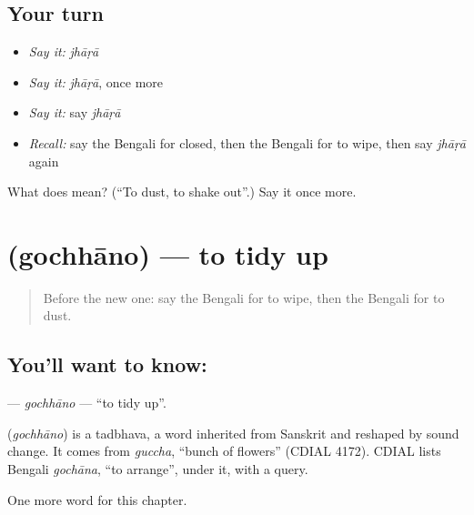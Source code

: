 \subsection*{Your turn}
\begin{itemize}
\raggedright
  \item \emph{Say it:} \emph{jhāṛā}
  \item \emph{Say it:} \emph{jhāṛā}, once more
  \item \emph{Say it:} say \emph{jhāṛā}
  \item \emph{Recall:} say the Bengali for closed, then the Bengali for to wipe, then say \emph{jhāṛā} again
\end{itemize}

\begin{tcolorbox}[breakable,colback=teal!4,colframe=teal!35!black,title={Before you move on}]
What does  mean? (\textquotedblleft{}To dust, to shake out\textquotedblright{}.) Say it once more.
\end{tcolorbox}
\section[\texorpdfstring{\bn{গোছানো} (gochhāno)}{গোছানো (gochhāno)}]{ (gochhāno) — to tidy up}

\label{lesson:BN-C105-gochhano}



\begin{quote}
Before the new one: say the Bengali for to wipe, then the Bengali for to dust.
\end{quote}

\subsection*{You'll want to know: }
\textbf{} — \emph{gochhāno} — \textquotedblleft{}to tidy up\textquotedblright{}.

\begin{cousinweb}
\textbf{} (\emph{gochhāno}) is a tadbhava, a word inherited from Sanskrit and reshaped by sound change. It comes from \emph{guccha}, \textquotedblleft{}bunch of flowers\textquotedblright{} (CDIAL 4172). CDIAL lists Bengali \emph{gochāna}, \textquotedblleft{}to arrange\textquotedblright{}, under it, with a query.
\end{cousinweb}

\begin{grammarlens}[title={What you've built}]
One more word for this chapter.
\end{grammarlens}

